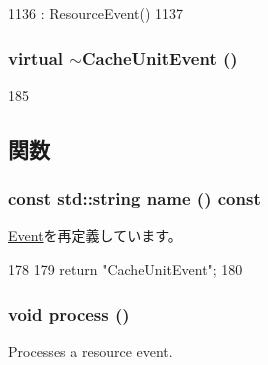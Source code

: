\begin{DoxyCode}
1136     : ResourceEvent()
1137 { }
\end{DoxyCode}
\hypertarget{classCacheUnitEvent_aa916e060e7102c3be76298f0cc4506e6}{
\subsubsection[{$\sim$CacheUnitEvent}]{\setlength{\rightskip}{0pt plus 5cm}virtual $\sim${\bf CacheUnitEvent} ()}}
\label{classCacheUnitEvent_aa916e060e7102c3be76298f0cc4506e6}



\begin{DoxyCode}
185 {}
\end{DoxyCode}


\subsection{関数}
\hypertarget{classCacheUnitEvent_a6490f765a824ced1cc94979609fe7e07}{
\subsubsection[{name}]{\setlength{\rightskip}{0pt plus 5cm}const std::string name () const}}
\label{classCacheUnitEvent_a6490f765a824ced1cc94979609fe7e07}


\hyperlink{classEvent_adbcff144e5e199d332a1352af1798148}{Event}を再定義しています。


\begin{DoxyCode}
178     {
179         return "CacheUnitEvent";
180     }
\end{DoxyCode}
\hypertarget{classCacheUnitEvent_a2e9c5136d19b1a95fc427e0852deab5c}{
\subsubsection[{process}]{\setlength{\rightskip}{0pt plus 5cm}void process ()}}
\label{classCacheUnitEvent_a2e9c5136d19b1a95fc427e0852deab5c}
Processes a resource event. 

